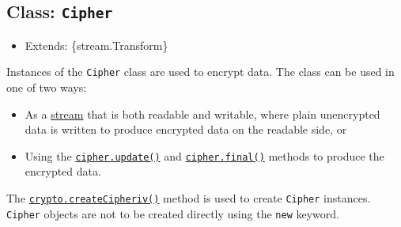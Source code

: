 \begin{Shaded}
\begin{Highlighting}[]
\NormalTok{ \{ }\NormalTok{ \} }\OperatorTok{=} \NormalTok{(}\NormalTok{)}\OperatorTok{;}
\OperatorTok{=} \NormalTok{(}\NormalTok{)}\OperatorTok{;}

\OperatorTok{=} \NormalTok{()}\OperatorTok{;}
\OperatorTok{=} \NormalTok{()}\OperatorTok{;}
\NormalTok{(}\OperatorTok{;}
\end{Highlighting}
\end{Shaded}

\subsection{\texorpdfstring{Class:
\texttt{Cipher}}{Class: Cipher}}\label{class-cipher}

\begin{itemize}
\tightlist
\item
  Extends: \{stream.Transform\}
\end{itemize}

Instances of the \texttt{Cipher} class are used to encrypt data. The
class can be used in one of two ways:

\begin{itemize}
\tightlist
\item
  As a \href{stream.md}{stream} that is both readable and writable,
  where plain unencrypted data is written to produce encrypted data on
  the readable side, or
\item
  Using the
  \hyperref[cipherupdatedata-inputencoding-outputencoding]{\texttt{cipher.update()}}
  and \hyperref[cipherfinaloutputencoding]{\texttt{cipher.final()}}
  methods to produce the encrypted data.
\end{itemize}

The
\hyperref[cryptocreatecipherivalgorithm-key-iv-options]{\texttt{crypto.createCipheriv()}}
method is used to create \texttt{Cipher} instances. \texttt{Cipher}
objects are not to be created directly using the \texttt{new} keyword.

